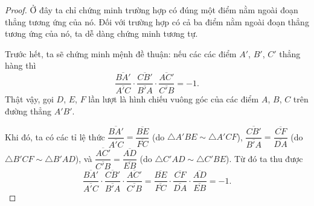         \begin{proof}
            Ở đây ta chỉ chứng minh trường hợp có đúng một điểm nằm ngoài đoạn thẳng tương ứng của nó. Đối với trường hợp có cả ba điểm nằm ngoài đoạn thẳng tương ứng của nó, ta dễ dàng chứng minh tương tự.

            Trước hết, ta sẽ chứng minh mệnh đề thuận: nếu các các điểm \(A'\), \(B'\), \(C'\) thẳng hàng thì
            \[\frac{\overline{BA'}}{\overline{A'C}} \cdot \frac{\overline{CB'}}{\overline{B'A}} \cdot \frac{\overline{AC'}}{\overline{C'B}} = -1.\]
            Thật vậy, gọi \(D\), \(E\), \(F\) lần lượt là hình chiếu vuông góc của các điểm \(A\), \(B\), \(C\) trên đường thẳng \(A'B'\). 
            
            Khi đó, ta có các tỉ lệ thức \(\dfrac{\overline{BA'}}{\overline{A'C}} = \dfrac{\overline{BE}}{\overline{FC}}\) (do \(\triangle A'BE \sim \triangle A'CF\)), \(\dfrac{\overline{CB'}}{\overline{B'A}} = \dfrac{\overline{CF}}{\overline{DA}}\) (do \(\triangle B'CF \sim \triangle B'AD\)), và \(\dfrac{\overline{AC'}}{\overline{C'B}} = \dfrac{\overline{AD}}{\overline{EB}}\) (do \(\triangle C'AD \sim \triangle C'BE\)). Từ đó ta thu được
            \[\frac{\overline{BA'}}{\overline{A'C}} \cdot \frac{\overline{CB'}}{\overline{B'A}} \cdot \frac{\overline{AC'}}{\overline{C'B}} = \frac{\overline{BE}}{\overline{FC}} \cdot \frac{\overline{CF}}{\overline{DA}} \cdot \frac{\overline{AD}}{\overline{EB}} = -1.\]


\end{proof}

